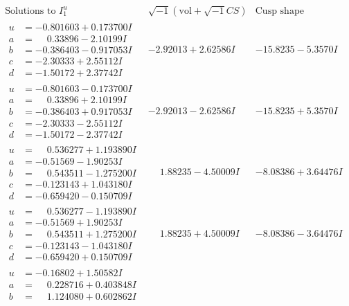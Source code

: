 \documentclass[1p]{elsarticle_modified}
\theoremstyle{definition}
\newcommand{\I}{\sqrt{-1}}
\begin{document}
$$\begin{array}{c|c|c}  
\text{Solutions to }I^u_{1}& \I (\text{vol} + \sqrt{-1}CS) & \text{Cusp shape}\\
 \hline 
\begin{aligned}
u &= -0.801603 + 0.173700 I \\
a &= \phantom{-}0.33896 - 2.10199 I \\
b &= -0.386403 - 0.917053 I \\
c &= -2.30333 + 2.55112 I \\
d &= -1.50172 + 2.37742 I\end{aligned}
 & -2.92013 + 2.62586 I & -15.8235 - 5.3570 I \\ \hline\begin{aligned}
u &= -0.801603 - 0.173700 I \\
a &= \phantom{-}0.33896 + 2.10199 I \\
b &= -0.386403 + 0.917053 I \\
c &= -2.30333 - 2.55112 I \\
d &= -1.50172 - 2.37742 I\end{aligned}
 & -2.92013 - 2.62586 I & -15.8235 + 5.3570 I \\ \hline\begin{aligned}
u &= \phantom{-}0.536277 + 1.193890 I \\
a &= -0.51569 - 1.90253 I \\
b &= \phantom{-}0.543511 - 1.275200 I \\
c &= -0.123143 + 1.043180 I \\
d &= -0.659420 - 0.150709 I\end{aligned}
 & \phantom{-}1.88235 - 4.50009 I & -8.08386 + 3.64476 I \\ \hline\begin{aligned}
u &= \phantom{-}0.536277 - 1.193890 I \\
a &= -0.51569 + 1.90253 I \\
b &= \phantom{-}0.543511 + 1.275200 I \\
c &= -0.123143 - 1.043180 I \\
d &= -0.659420 + 0.150709 I\end{aligned}
 & \phantom{-}1.88235 + 4.50009 I & -8.08386 - 3.64476 I \\ \hline\begin{aligned}
u &= -0.16802 + 1.50582 I \\
a &= \phantom{-}0.228716 + 0.403848 I \\
b &= \phantom{-}1.124080 + 0.602862 I \\

\end{aligned}
\end{array}$$
\end{document}
